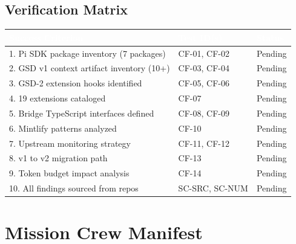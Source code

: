\documentclass[11pt,letterpaper]{article}
\newcommand{\tableheader}[1]{\textbf{\sffamily\textcolor{white}{#1}}}
\begin{document}
\subsection{Verification Matrix}

\begin{center}
\begin{tabularx}{\textwidth}{XL{3.5cm}C{1.5cm}}
\toprule
{}
\tableheader{Success Criterion} & \tableheader{Test ID(s)} & \tableheader{Status} \\
. Pi SDK package inventory (7 packages) & CF-01, CF-02 & Pending \\
2. GSD v1 context artifact inventory (10+) & CF-03, CF-04 & Pending \\
3. GSD-2 extension hooks identified & CF-05, CF-06 & Pending \\
4. 19 extensions cataloged & CF-07 & Pending \\
5. Bridge TypeScript interfaces defined & CF-08, CF-09 & Pending \\
6. Mintlify patterns analyzed & CF-10 & Pending \\
7. Upstream monitoring strategy & CF-11, CF-12 & Pending \\
8. v1 to v2 migration path & CF-13 & Pending \\
9. Token budget impact analysis & CF-14 & Pending \\
10. All findings sourced from repos & SC-SRC, SC-NUM & Pending \\
\bottomrule
\end{tabularx}
\end{center}

\section{Mission Crew Manifest}
\end{document}
